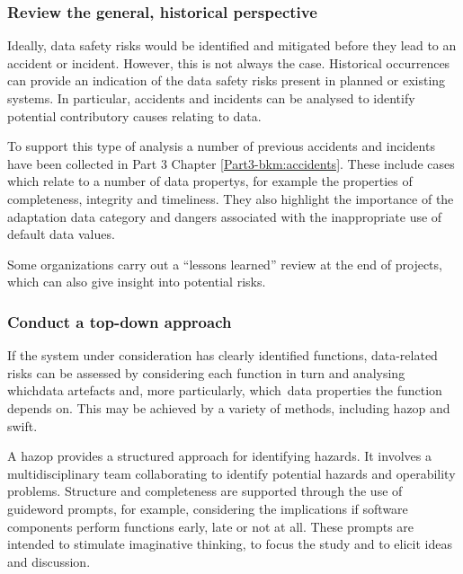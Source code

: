 \subsubsection{Review the general, historical perspective}
Ideally, data safety risks would be identified and mitigated before they lead to an accident or incident. However, this is not always the case. Historical occurrences can provide an indication of the data safety risks present in planned or existing systems. In particular, accidents and incidents can be analysed to identify potential contributory causes relating to data.

To support this type of analysis a number of previous accidents and incidents have been collected in Part 3 Chapter \autoref{Part3-bkm:accidents}.
These include cases which relate to a number of \glspl{data property},
for example the properties of \gls{completeness}, \gls{integrity} and \gls{timeliness}.
They also highlight the importance of the \gls{adaptation data} category and dangers associated with the inappropriate use of default data values.

Some organizations carry out a ``lessons learned'' review at the end of projects, which can also give insight into potential risks.
\subsubsection{Conduct a top-down approach}
If the system under consideration has clearly identified functions, data-related risks can be assessed by considering each function in turn and analysing \cbstart which\cbend{}\glspl{data artefact} and, more particularly, \cbstart which\cbend\ data properties the function depends on. This may be achieved by a variety of methods, including \gls{hazop} and \gls{swift}.

A \gls{hazop} \cite{citation:iec61882:2016}
provides a structured approach for identifying hazards. It involves a multidisciplinary team collaborating to identify potential hazards and operability problems. Structure and \gls{completeness} are supported through the use of guideword prompts, for example, considering the implications if software components perform functions early, late or not at all. These prompts are intended to stimulate imaginative thinking, to focus the study and to elicit ideas and discussion.

